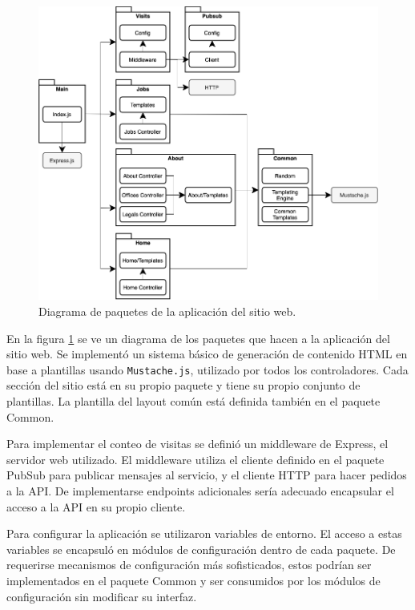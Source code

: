 \documentclass[11pt]{scrartcl}
\begin{document}
\begin{figure}
\begin{center}
\includegraphics[width=\linewidth]{img/website-packages}
\end{center}
\caption{Diagrama de paquetes de la aplicación del sitio web.}
\label{fig:website-packages}
\end{figure}

En la figura \ref{fig:website-packages} se ve un diagrama de los paquetes que hacen a la aplicación del sitio web. Se implementó un sistema básico de generación de contenido HTML en base a plantillas usando \texttt{Mustache.js}, utilizado por todos los controladores. Cada sección del sitio está en su propio paquete y tiene su propio conjunto de plantillas. La plantilla del layout común está definida también en el paquete Common.

Para implementar el conteo de visitas se definió un middleware de Express, el servidor web utilizado. El middleware utiliza el cliente definido en el paquete PubSub para publicar mensajes al servicio, y el cliente HTTP para hacer pedidos a la API. De implementarse endpoints adicionales sería adecuado encapsular el acceso a la API en su propio cliente.

Para configurar la aplicación se utilizaron variables de entorno. El acceso a estas variables se encapsuló en módulos de configuración dentro de cada paquete. De requerirse mecanismos de configuración más sofisticados, estos podrían ser implementados en el paquete Common y ser consumidos por los módulos de configuración sin modificar su interfaz.
\end{document}
